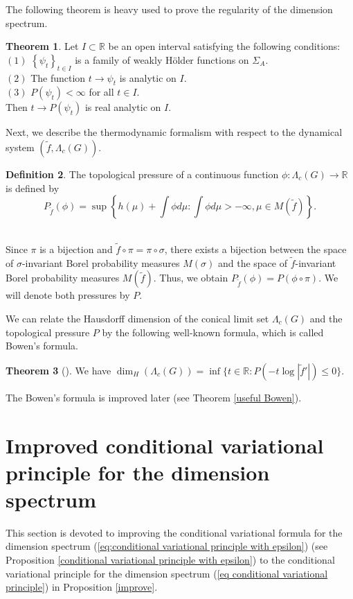 \documentclass{article}
\theoremstyle{definition}
\newtheorem{thm}{Theorem}[section]
\newtheorem{definition}[thm]{Definition}
\begin{document}
 The following theorem is heavy used to prove the regularity of the dimension spectrum.
 \begin{thm}
     Let $I\subset \mathbb{R}$ be an open interval satisfying the following conditions: \\
     $(1)$ $\left\{ \psi_t \right\}_{t\in I}$ is a family of weakly H\"{o}lder functions on $\Sigma_A$. \\
     $(2)$ The function $t\rightarrow \psi_t$ is analytic on $I$.\\
     $(3)$ $P(\psi_t)<\infty$ for all $t\in I$.\\
     Then $t \rightarrow P(\psi_t)$ is real analytic on $I$.
 \end{thm}
Next, we describe the thermodynamic formalism with respect to the dynamical system $(\tilde f,\Lambda_c(G))$.
\begin{definition}
The topological pressure of a continuous function $\phi : \Lambda_c(G)\rightarrow \mathbb{R}$ is defined by
\begin{equation}
P_{\tilde f}(\phi)=\sup \left\{ h(\mu) + \int \phi d\mu :  \int \phi d\mu > -\infty , \mu \in {M}({\tilde f}) \right\}.\nonumber
\end{equation}\
\end{definition}
Since $\pi$ is a bijection and $\tilde f \circ \pi = \pi \circ \sigma$, there exists a bijection between the space of $\sigma$-invariant Borel probability measures ${M}({\sigma})$ and the space of $\tilde f$-invariant Borel probability measures ${M}({\tilde f})$. Thus, we obtain $P_{\tilde f}(\phi)=P(\phi \circ \pi)$.  We will denote both pressures by $P$.


We can relate the Hausdorff dimension of the conical limit set $\Lambda_c(G)$ and the topological pressure $P$ by the following well-known formula, which is called Bowen's formula. 
\begin{thm}[{\cite[Theorem 4.2.13]{mauldin2003graph}}]\label{Bowen} We have 
    $\dim_H(\Lambda_c(G))=\inf\{t\in\mathbb{R}:P(-t\log|\tilde f'|)\leq0\}.$
\end{thm}
The Bowen's formula is improved later (see Theorem \ref{useful Bowen}).











\section{Improved conditional variational principle for the dimension spectrum}
This section is devoted to improving the conditional variational formula for the dimension spectrum (\ref{eq:conditional variational principle with epsilon}) (see Proposition \ref{conditional variational principle with epsilon}) to the conditional variational principle for the dimension spectrum (\ref{eq conditional variational principle}) in Proposition \ref{improve}.
\end{document}
